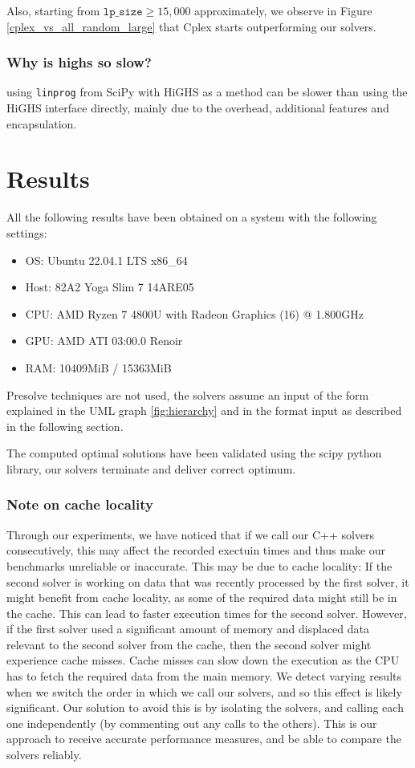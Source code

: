 Also, starting from $\texttt{lp\_size} \geq 15,000$ approximately, we observe in Figure
\ref{cplex_vs_all_random_large} that Cplex starts outperforming our solvers.

\subsubsection{Why is highs so slow?}
using \texttt{linprog} from SciPy with HiGHS as a method can be 
slower than using the HiGHS interface directly, mainly due to the overhead, 
additional features and encapsulation.

\section{Results}
All the following results have been obtained on a system with the following settings:
\begin{itemize}
    \item OS: Ubuntu 22.04.1 LTS x86\_64
    \item Host: 82A2 Yoga Slim 7 14ARE05
    \item CPU: AMD Ryzen 7 4800U with Radeon Graphics (16) @ 1.800GHz
    \item GPU: AMD ATI 03:00.0 Renoir
    \item RAM: 10409MiB / 15363MiB
\end{itemize}

Presolve techniques are not used, the solvers assume an input of the form explained
in the UML graph \ref{fig:hierarchy} and in the format input as described
in the following section.

The computed optimal solutions have been validated using the scipy python library,
our solvers terminate and deliver correct optimum.

\subsubsection{Note on cache locality}
Through our experiments, we have noticed that if we call our C++ solvers
consecutively, this may affect the recorded exectuin times and thus make our benchmarks
unreliable or inaccurate. This may be due to cache locality: If the second solver is working
on data that was recently processed by the first solver, it might benefit from cache locality,
as some of the required data
might still be in the cache. This can lead to faster execution times for the second solver.
However, if the first solver used a significant amount of memory and displaced data relevant
to the second solver from the cache, then the second solver might experience cache misses.
Cache misses
can slow down the execution as the CPU has to fetch the required data from the main memory.
We detect varying results when we switch the order in which we call our solvers, and so
this effect is likely significant.
Our solution to avoid this is by isolating the solvers, and calling each one independently
(by commenting out any calls to the others). This is our approach to receive
accurate performance measures, and be able to compare the solvers reliably.

